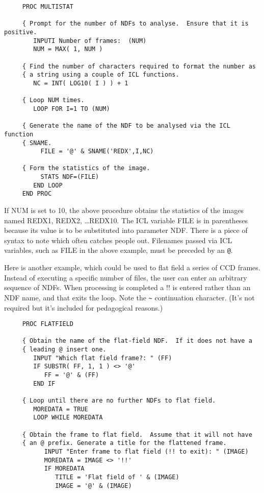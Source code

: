 {\small
\begin{verbatim}
     PROC MULTISTAT

     { Prompt for the number of NDFs to analyse.  Ensure that it is positive.
        INPUTI Number of frames:  (NUM)
        NUM = MAX( 1, NUM )

     { Find the number of characters required to format the number as
     { a string using a couple of ICL functions.
        NC = INT( LOG10( I ) ) + 1

     { Loop NUM times.
        LOOP FOR I=1 TO (NUM)

     { Generate the name of the NDF to be analysed via the ICL function
     { SNAME.
          FILE = '@' & SNAME('REDX',I,NC)

     { Form the statistics of the image.
          STATS NDF=(FILE)
        END LOOP
     END PROC
\end{verbatim}
\normalsize
If NUM is set to 10, the above procedure obtains the statistics of the
images named REDX1, REDX2, \dots REDX10. The {\small
ICL} variable FILE is in parentheses because its value is to be
substituted into parameter NDF. There is a piece of syntax to note which
often catches people out. Filenames passed via {\small ICL} variables,
such as FILE in the above example, must be preceded by an {\tt @}.

Here is another example, which could be used to flat field a series of
CCD frames.  Instead of executing a specific number of files, the
user can enter an arbitrary sequence of NDFs.  When processing is
completed a !! is entered rather than an NDF name, and that exits the
loop.  Note the {\tt \~{}} continuation character. (It's not
required but it's included for pedagogical reasons.)
\pagebreak[3]

\small
\begin{verbatim}
     PROC FLATFIELD

     { Obtain the name of the flat-field NDF.  If it does not have a
     { leading @ insert one.
        INPUT "Which flat field frame?: " (FF)
        IF SUBSTR( FF, 1, 1 ) <> '@'
           FF = '@' & (FF)
        END IF

     { Loop until there are no further NDFs to flat field.
        MOREDATA = TRUE
        LOOP WHILE MOREDATA

     { Obtain the frame to flat field.  Assume that it will not have
     { an @ prefix. Generate a title for the flattened frame.
           INPUT "Enter frame to flat field (!! to exit): " (IMAGE)
           MOREDATA = IMAGE <> '!!'
           IF MOREDATA
              TITLE = 'Flat field of ' & (IMAGE)
              IMAGE = '@' & (IMAGE)


\end{verbatim}}
